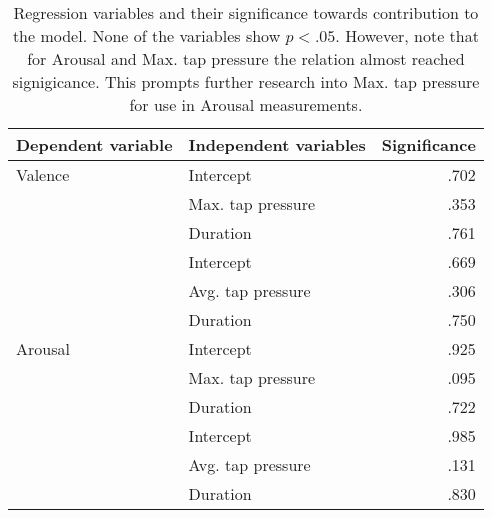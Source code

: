 \begin{table}[ht]
\centering
\begin{tabular}{@{}llr@{}}
\textbf{Dependent variable} & \textbf{Independent variables} & \textbf{Significance} \\ \midrule
Valence                     & Intercept                       & .702                  \\
                            & Max. tap pressure               & .353                  \\
                            & Duration                        & .761                  \\ \cmidrule(l){2-3} 
                            & Intercept                       & .669                  \\
                            & Avg. tap pressure               & .306                  \\
                            & Duration                        & .750                  \\ \midrule
Arousal                     & Intercept                       & .925                  \\
                            & Max. tap pressure               & .095                  \\
                            & Duration                        & .722                  \\ \cmidrule(l){2-3} 
                            & Intercept                       & .985                  \\
                            & Avg. tap pressure               & .131                  \\
                            & Duration                        & .830                 
\end{tabular}
\caption{Regression variables and their significance towards contribution to the model. None of the variables show $p < .05$. However, note that for Arousal and Max. tap pressure the relation almost reached signigicance. This prompts further research into Max. tap pressure for use in Arousal measurements.}
\label{tab:regression_significance}
\end{table}